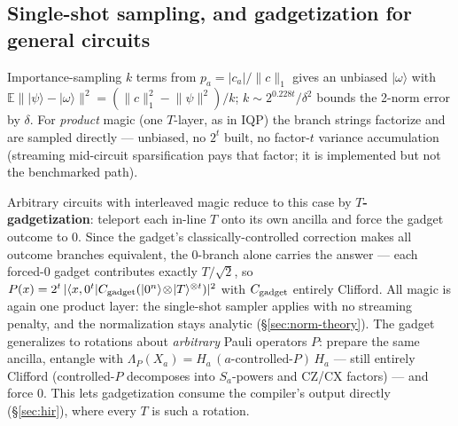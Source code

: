 \documentclass[11pt]{article}
\newcommand{\ket}[1]{\lvert #1 \rangle}
\newcommand{\bra}[1]{\langle #1 \rvert}
\begin{document}
\subsection{Single-shot sampling, and gadgetization for general circuits}
\label{sec:gadget-theory}
Importance-sampling $k$ terms from $p_a=|c_a|/\lVert c\rVert_1$ gives an
unbiased $\ket\omega$ with
$\mathbb{E}\lVert\ket\psi-\ket\omega\rVert^2=(\lVert c\rVert_1^2-\lVert\psi\rVert^2)/k$;
$k\sim 2^{0.228t}/\delta^2$ bounds the 2-norm error by $\delta$. For
\emph{product} magic (one $T$-layer, as in IQP) the branch strings factorize
and are sampled directly --- unbiased, no $2^t$ built, no factor-$t$ variance
accumulation (streaming mid-circuit sparsification pays that factor; it is
implemented but not the benchmarked path).

Arbitrary circuits with interleaved magic reduce to this case by
\textbf{$T$-gadgetization}: teleport each in-line $T$ onto its own ancilla
and force the gadget outcome to $0$. Since the gadget's
classically-controlled correction makes all outcome branches equivalent, the
$0$-branch alone carries the answer --- each forced-$0$ gadget contributes
exactly $T/\sqrt2$, so
$P(x) = 2^{t}\,|\bra{x,0^t} C_{\rm gadget} (\ket{0^n}\!\otimes\!\ket{T}^{\otimes t})|^2$
with $C_{\rm gadget}$ entirely Clifford. All magic is again one product
layer: the single-shot sampler applies with no streaming penalty, and the
normalization stays analytic (\S\ref{sec:norm-theory}). The gadget
generalizes to rotations about \emph{arbitrary} Pauli operators $P$: prepare
the same ancilla, entangle with
$\Lambda_P(X_a)=H_a\,(\text{$a$-controlled-}P)\,H_a$ --- still entirely
Clifford (controlled-$P$ decomposes into $S_a$-powers and CZ/CX factors) ---
and force $0$. This lets gadgetization consume the compiler's output
directly (\S\ref{sec:hir}), where every $T$ is such a rotation.
\end{document}
